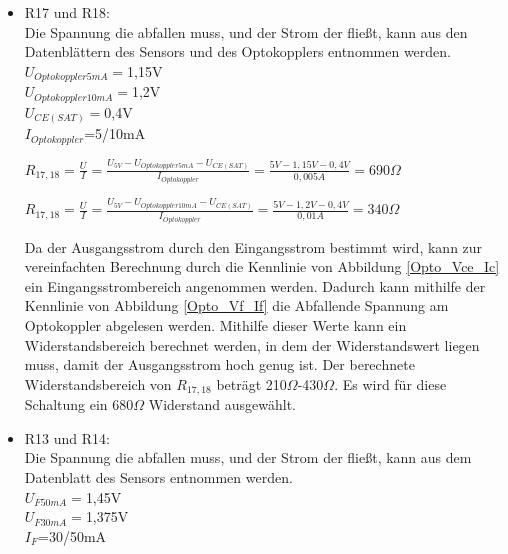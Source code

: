 \begin{itemize}
\item R17 und R18: \\
Die Spannung die abfallen muss, und der Strom der fließt, kann aus den Datenblättern des Sensors und des Optokopplers entnommen werden.\\
$U_{Optokoppler 5mA}=$1,15V \\
$U_{Optokoppler 10mA}=$1,2V \\
$U_{CE(SAT)}=$0,4V \\
$I_{Optokoppler}$=5/10mA \\

\begin{center}
$R_{17,18}=\frac{U}{I}=\frac{U_{5V}-U_{Optokoppler 5mA}-U_{CE(SAT)}}{I_{Optokoppler}}=\frac{5V-1,15V-0,4V}{0,005A}=690\Omega$
\end{center}

\begin{center}
$R_{17,18}=\frac{U}{I}=\frac{U_{5V}-U_{Optokoppler 10mA}-U_{CE(SAT)}}{I_{Optokoppler}}=\frac{5V-1,2V-0,4V}{0,01A}=340\Omega$
\end{center}

Da der Ausgangsstrom durch den Eingangsstrom bestimmt wird, kann zur vereinfachten Berechnung durch die Kennlinie von Abbildung \ref{Opto_Vce_Ic} ein Eingangsstrombereich angenommen werden. Dadurch kann mithilfe der Kennlinie von Abbildung \ref{Opto_Vf_If} die Abfallende Spannung am Optokoppler abgelesen werden. Mithilfe dieser Werte kann ein Widerstandsbereich berechnet werden, in dem der Widerstandswert liegen muss, damit der Ausgangsstrom hoch genug ist. Der berechnete Widerstandsbereich von $R_{17,18}$ beträgt 210$\Omega$-430$\Omega$. Es wird für diese Schaltung ein 680$\Omega$ Widerstand ausgewählt.
\item R13 und R14:\\
Die Spannung die abfallen muss, und der Strom der fließt, kann aus dem Datenblatt des Sensors entnommen werden.\\
$U_{F 50mA}=$1,45V \\
$U_{F 30mA}=$1,375V \\
$I_{F}$=30/50mA \\


\end{itemize}
